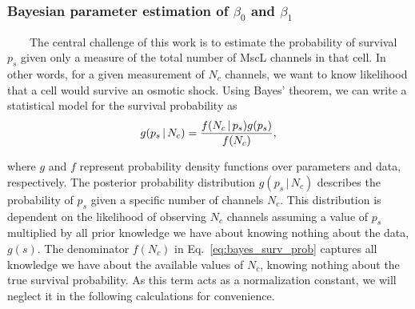 \subsubsection{\texorpdfstring{Bayesian
parameter
estimation
of
\(\beta_0\)
and
\(\beta_1\)}{Bayesian parameter estimation of \textbackslash{}beta\_0 and \textbackslash{}beta\_1}}\label{bayesian-parameter-estimation-of-beta_0-and-beta_1}

~~~~The
central
challenge
of
this
work
is to
estimate
the
probability
of
survival
\(p_s\)
given
only a
measure
of the
total
number
of
MscL
channels
in
that
cell.
In
other
words,
for a
given
measurement
of
\(N_c\)
channels,
we
want
to
know
likelihood
that a
cell
would
survive
an
osmotic
shock.
Using
Bayes'
theorem,
we can
write
a
statistical
model
for
the
survival
probability
as
\begin{equation}
g(p_s\,\vert\, N_c) = {f(N_c\,\vert\, p_s)g(p_s) \over f(N_c)},
\label{eq:bayes_surv_prob}\end{equation}

where
\(g\)
and
\(f\)
represent
probability
density
functions
over
parameters
and
data,
respectively.
The
posterior
probability
distribution
\(g(p_s\,\vert\, N_c)\)
describes
the
probability
of
\(p_s\)
given
a
specific
number
of
channels
\(N_c\).
This
distribution
is
dependent
on the
likelihood
of
observing
\(N_c\)
channels
assuming
a
value
of
\(p_s\)
multiplied
by all
prior
knowledge
we
have
about
knowing
nothing
about
the
data,
\(g(s)\).
The
denominator
\(f(N_c)\)
in
Eq.~\ref{eq:bayes_surv_prob}
captures
all
knowledge
we
have
about
the
available
values
of
\(N_c\),
knowing
nothing
about
the
true
survival
probability.
As
this
term
acts
as a
normalization
constant,
we
will
neglect
it in
the
following
calculations
for
convenience.

